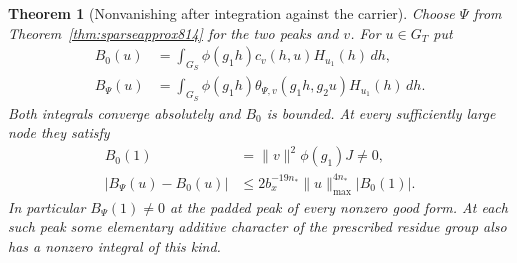 \documentclass[a4paper,11pt]{article}
\newtheorem{theorem}[proposition]{Theorem}
\theoremstyle{definition}
\theoremstyle{remark}
\numberwithin{equation}{section}
\begin{document}
\begin{theorem}[Nonvanishing after integration against the carrier]
\leavevmode\label{thm:integratedpeak815}
Choose \(\Psi\) from Theorem~\ref{thm:sparseapprox814}
for the two peaks and \(v\). For \(u\in G_T\) put
\[
 \begin{aligned}
  B_0(u)&=\int_{G_S}\phi(g_1h)c_v(h,u)H_{u_1}(h)\,dh,\\
  B_\Psi(u)&=\int_{G_S}\phi(g_1h)
         \theta_{\Psi,v}(g_1h,g_2u)H_{u_1}(h)\,dh .
 \end{aligned}
\]
Both integrals converge absolutely and \(B_0\) is bounded.
At every sufficiently large node they satisfy
\[
 \begin{aligned}
    B_0(1)&=\|v\|^2\phi(g_1)J\ne0,\\
    |B_\Psi(u)-B_0(u)|
       &\le 2 b_x^{-19n_*}\|u\|_{\max}^{4n_*}|B_0(1)|.
 \end{aligned}
\]
In particular \(B_\Psi(1)\ne0\) at the padded peak of
every nonzero good form. At each such peak some elementary
additive character of the prescribed residue group also
has a nonzero integral of this kind.
\end{theorem}
\end{document}
